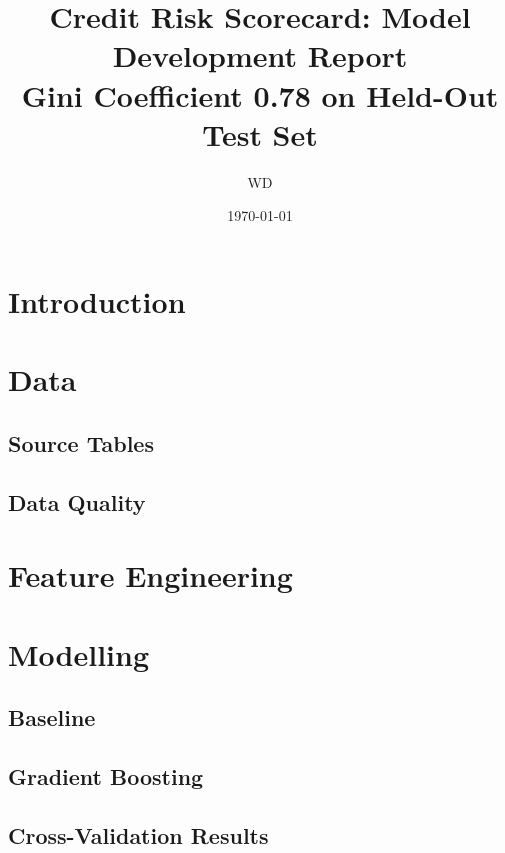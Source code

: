 \documentclass[12pt, a4paper]{article}
\title{Credit Risk Scorecard: Model Development Report\\
       \large Gini Coefficient 0.78 on Held-Out Test Set}
\author{WD}
\date{\today}
\begin{document}
\maketitle
\tableofcontents
\newpage

\section{Introduction}

\section{Data}
\subsection{Source Tables}

\subsection{Data Quality}

\section{Feature Engineering}

\section{Modelling}
\subsection{Baseline}

\subsection{Gradient Boosting}

\subsection{Cross-Validation Results}
\end{document}
